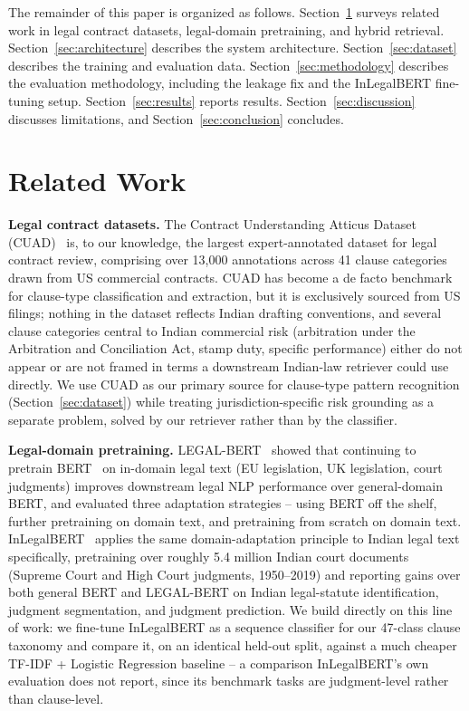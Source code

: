 \documentclass[conference]{IEEEtran}
\begin{document}
The remainder of this paper is organized as follows. Section~\ref{sec:related} surveys related work in legal contract datasets, legal-domain pretraining, and hybrid retrieval. Section~\ref{sec:architecture} describes the system architecture. Section~\ref{sec:dataset} describes the training and evaluation data. Section~\ref{sec:methodology} describes the evaluation methodology, including the leakage fix and the InLegalBERT fine-tuning setup. Section~\ref{sec:results} reports results. Section~\ref{sec:discussion} discusses limitations, and Section~\ref{sec:conclusion} concludes.

\section{Related Work}
\label{sec:related}

\textbf{Legal contract datasets.} The Contract Understanding Atticus Dataset (CUAD)~\cite{cuad2021} is, to our knowledge, the largest expert-annotated dataset for legal contract review, comprising over 13,000 annotations across 41 clause categories drawn from US commercial contracts. CUAD has become a de facto benchmark for clause-type classification and extraction, but it is exclusively sourced from US filings; nothing in the dataset reflects Indian drafting conventions, and several clause categories central to Indian commercial risk (arbitration under the Arbitration and Conciliation Act, stamp duty, specific performance) either do not appear or are not framed in terms a downstream Indian-law retriever could use directly. We use CUAD as our primary source for clause-type pattern recognition (Section~\ref{sec:dataset}) while treating jurisdiction-specific risk grounding as a separate problem, solved by our retriever rather than by the classifier.

\textbf{Legal-domain pretraining.} LEGAL-BERT~\cite{legalbert2020} showed that continuing to pretrain BERT~\cite{devlin2019bert} on in-domain legal text (EU legislation, UK legislation, court judgments) improves downstream legal NLP performance over general-domain BERT, and evaluated three adaptation strategies -- using BERT off the shelf, further pretraining on domain text, and pretraining from scratch on domain text. InLegalBERT~\cite{inlegalbert2023} applies the same domain-adaptation principle to Indian legal text specifically, pretraining over roughly 5.4 million Indian court documents (Supreme Court and High Court judgments, 1950--2019) and reporting gains over both general BERT and LEGAL-BERT on Indian legal-statute identification, judgment segmentation, and judgment prediction. We build directly on this line of work: we fine-tune InLegalBERT as a sequence classifier for our 47-class clause taxonomy and compare it, on an identical held-out split, against a much cheaper TF-IDF + Logistic Regression baseline -- a comparison InLegalBERT's own evaluation does not report, since its benchmark tasks are judgment-level rather than clause-level.
\end{document}
